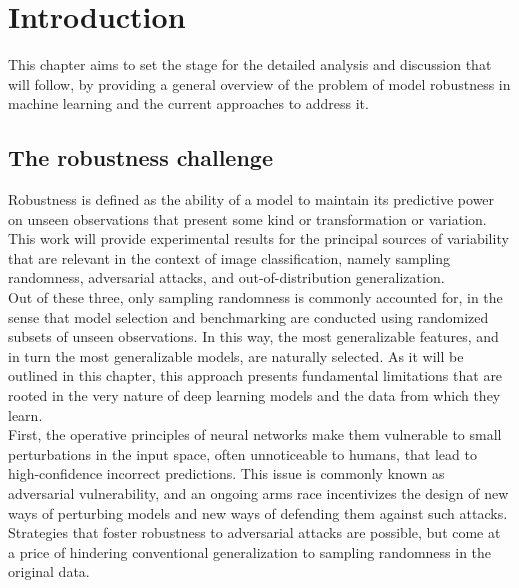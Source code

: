 \chapter{Introduction}\label{sec:introduction}

This chapter aims to set the stage for the detailed analysis and discussion that will follow, by 
providing a general overview of the problem of model robustness in 
machine learning and the current approaches to address it.

\section{The robustness challenge}\label{sec:motivation}

Robustness is defined as the ability of a model to maintain its
predictive power on unseen observations that present 
some kind or transformation or variation.
This work will provide experimental results for the principal sources
of variability that are relevant in the context
of image classification, namely sampling randomness, adversarial
attacks, and out-of-distribution generalization.\\


Out of these three, only sampling 
randomness is commonly accounted for, 
in the sense that model selection and benchmarking are conducted
using randomized subsets of unseen observations. In this way, the most
generalizable features, and in turn the most generalizable models, are
naturally selected. As it will be outlined in this chapter, 
this approach presents fundamental limitations
that are rooted in the very nature of deep learning models and
the data from which they learn. \\

First, the operative principles of neural networks make them vulnerable
to small perturbations in the input space,
often unnoticeable to humans, that lead to high-confidence
incorrect predictions.
This issue is commonly known as adversarial
vulnerability, and an ongoing arms race incentivizes the design 
of new ways of perturbing models and new ways of defending them
against such attacks. Strategies 
that foster robustness to adversarial attacks are possible, but
come at a price of hindering conventional generalization to 
sampling randomness in the original data. \\

